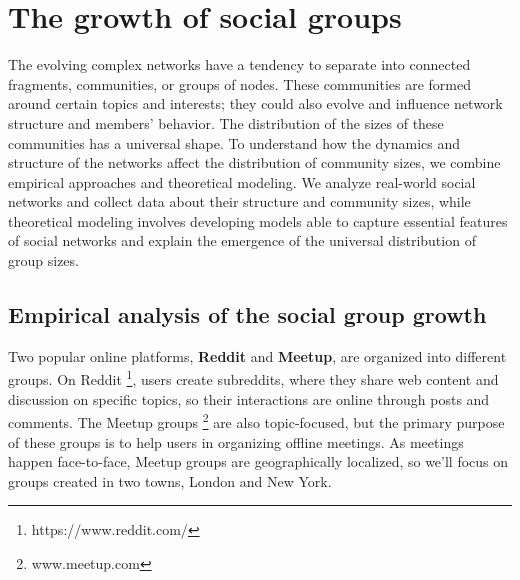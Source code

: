 \chapter{The growth of social groups}
\label{Ch:Groups}

The evolving complex networks have a tendency to separate into connected fragments, communities, or groups of nodes. These communities are formed around certain topics and interests; they could also evolve and influence network structure and members' behavior. The distribution of the sizes of these communities has a universal shape. To understand how the dynamics and structure of the networks affect the distribution of community sizes, we combine empirical approaches and theoretical modeling. We analyze real-world social networks and collect data about their structure and community sizes, while theoretical modeling involves developing models able to capture essential features of social networks and explain the emergence of the universal distribution of group sizes.


\section{Empirical analysis of the social group growth}

Two popular online platforms, \textbf{Reddit} and \textbf{Meetup}, are organized into different groups. On Reddit \footnote{https://www.reddit.com/}, users create subreddits, where they share web content and discussion on specific topics, so their interactions are online through posts and comments. The Meetup groups \footnote{www.meetup.com} are also topic-focused, but the primary purpose of these groups is to help users in organizing offline meetings. As meetings happen face-to-face, Meetup groups are geographically localized, so we'll focus on groups created in two towns, London and New York.  


